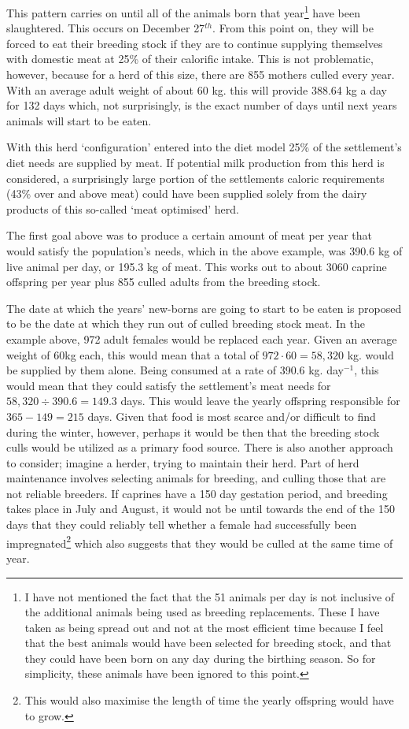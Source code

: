  This pattern carries on until all of the animals born that year\footnote{I have not mentioned the fact that the 51 animals per day is not inclusive of the additional animals being used as breeding replacements.  These I have taken as being spread out and not at the most efficient time because I feel that the best animals would have been selected for breeding stock, and that they could have been born on any day during the birthing season.  So for simplicity, these animals have been ignored to this point.} have been slaughtered.  This occurs on December 27$^{th}$.  From this point on, they will be forced to eat their breeding stock if they are to continue supplying themselves with domestic meat at 25\% of their calorific intake.  This is not problematic, however, because for a herd of this size, there are 855 mothers culled every year.  With an average adult weight of about 60 kg. this will provide 388.64 kg a day for 132 days which, not surprisingly, is the exact number of days until next years animals will start to be eaten.


With this herd `configuration' entered into the diet model 25\% of the settlement's diet needs are supplied by meat.  If potential milk production from this herd is considered, a surprisingly large portion of the settlements caloric requirements (43\% over and above meat) %
could have been supplied solely from the dairy products of this so-called `meat optimised' herd.  

The first goal above was to produce a certain amount of meat per year that would satisfy the population's needs, which in the above example, was 390.6 kg of live animal per day, or 195.3 kg of meat.  This works out to about 3060 caprine offspring per year plus 855 culled adults from the breeding stock.

The date at which the years' new-borns are going to start to be eaten\label{startToEatOffspring} is proposed to be the date at which they run out of culled breeding stock meat.  In the example above, 972 adult females would be replaced each year.  Given an average weight of 60kg each, this would mean that a total of $972 \cdot 60 = 58,320$ kg. would be supplied by them alone.  Being consumed at a rate of 390.6 kg. day$^{-1}$, this would mean that they could satisfy the settlement's meat needs for $58,320 \div 390.6 = 149.3$ days.  This would leave the yearly offspring responsible for $365-149 = 215$ days.  Given that food is most scarce and/or difficult to find during the winter, however, perhaps it would be then that the breeding stock culls would be utilized as a primary food source. There is also another approach to consider; imagine a herder, %
trying to maintain their herd.  Part of herd maintenance involves selecting animals for breeding, and culling those that are not reliable breeders.  If caprines have a 150 day gestation period, and breeding takes place in July and August,  it would not be until towards the end of the 150 days that they could reliably tell whether a female had successfully been impregnated\footnote{This would also maximise the length of time the yearly offspring would have to grow.} which also suggests that they would be culled at the same time of year.

